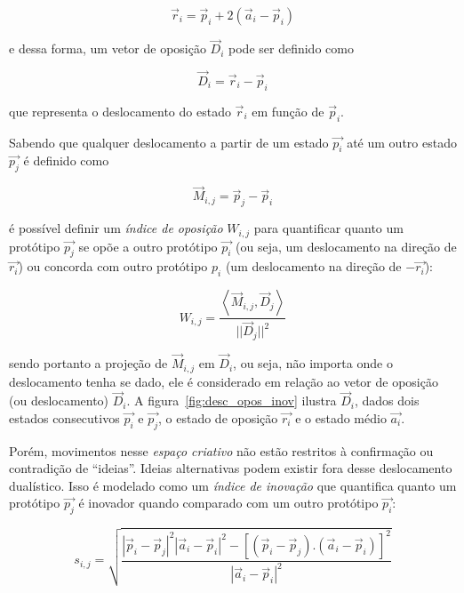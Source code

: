 \begin{equation}
\vec{r}_i = \vec{p}_i + 2(\vec{a}_i - \vec{p}_i)
\end{equation}

\noindent e dessa forma, um vetor de oposição $\vec{D}_i$ pode ser definido como

\begin{equation}
\vec{D}_i=\vec{r}_i - \vec{p}_i
\end{equation}

\noindent que representa o deslocamento do estado $\vec{r}_i$ em
função de $\vec{p}_i$.

Sabendo que qualquer deslocamento a partir de um estado $\vec{p_i}$ até um outro
estado $\vec{p_j}$ é definido como

\begin{equation}
\vec{M}_{i,j} = \vec{p}_j - \vec{p}_i
\end{equation}

\noindent é possível definir um \emph{índice de oposição} $W_{i,j}$ para
quantificar quanto um protótipo $\vec{p_j}$ se opõe a outro protótipo $\vec{p_i}$ (ou seja,
um deslocamento na direção de $\vec{r_i}$) ou concorda com outro protótipo $p_i$
(um deslocamento na direção de $-\vec{r_i}$):

\begin{equation}
W_{i,j} = \frac{\left< \vec{M}_{i,j}, \vec{D}_j\right>}{||\vec{D}_j||^2}
\end{equation}

\noindent sendo portanto a projeção de $\vec{M}_{i,j}$ em $\vec{D}_i$, ou seja,
não importa onde o deslocamento tenha se dado, ele é considerado em relação ao
vetor de oposição (ou deslocamento) $\vec{D}_i$. A
figura~\ref{fig:desc_opos_inov} ilustra $\vec{D}_i$, dados dois estados
consecutivos $\vec{p_i}$ e $\vec{p_j}$, o estado de oposição $\vec{r_i}$ e o
estado médio $\vec{a_i}$.

Porém, movimentos nesse \textit{espaço criativo} não estão restritos à
confirmação ou contradição de ``ideias''. Ideias alternativas podem existir fora
desse deslocamento dualístico. Isso é modelado como um \emph{índice de inovação}
que quantifica quanto um protótipo $\vec{p_j}$ é inovador quando comparado com um
outro protótipo $\vec{p_i}$:


\begin{equation}
s_{i,j} = \sqrt{\frac{|\vec{p}_i-\vec{p}_j|^2
          |\vec{a}_i-\vec{p}_i|^2 - 
          [(\vec{p}_i-\vec{p}_j) . 
            (\vec{a}_i-\vec{p}_i)]^2}
        {|\vec{a}_i-\vec{p}_i|^2}}
\end{equation}


